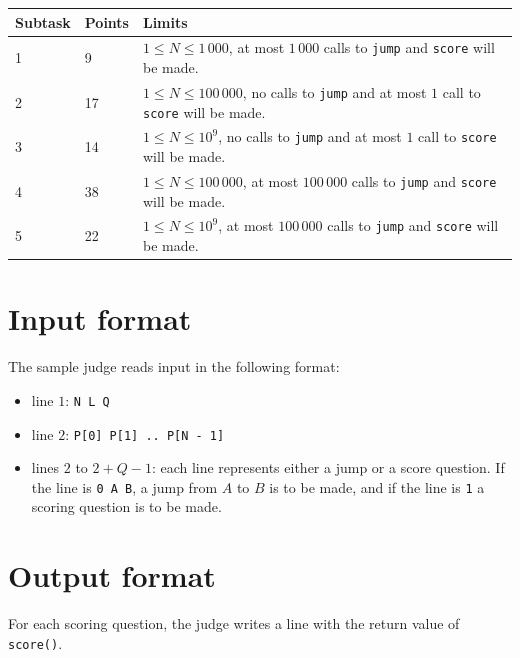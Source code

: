 \begin{tabular}{|l|l|l|}
  \hline
  \textbf{Subtask} & \textbf{Points} & \textbf{Limits} \\ \hline
  1 & 9 & $1 \le N \le 1\,000$, at most $1\,000$ calls to \texttt{jump} and \texttt{score} will be made. \\ \hline
  2 & 17 & $1 \le N \le 100\,000$, no calls to \texttt{jump} and at most $1$ call to \texttt{score} will be made. \\ \hline
  3 & 14 & $1 \le N \le 10^9$, no calls to \texttt{jump} and at most $1$ call to \texttt{score} will be made. \\ \hline
  4 & 38 & $1 \le N \le 100\,000$, at most $100\,000$ calls to \texttt{jump} and \texttt{score} will be made. \\ \hline
  5 & 22 & $1 \le N \le 10^9$, at most $100\,000$ calls to \texttt{jump} and \texttt{score} will be made. \\ \hline
\end{tabular}

\section*{Input format}
The sample judge reads input in the following format:

\begin{itemize}
  \item line $1$: \texttt{N L Q}
  \item line $2$: \texttt{P[0] P[1] .. P[N - 1]}
  \item lines $2$ to $2 + Q - 1$: each line represents either a jump or a score question.
    If the line is \texttt{0 A B}, a jump from $A$ to $B$ is to be made, and if the line is \texttt{1} a scoring question is to be made.
\end{itemize}

\section*{Output format}
For each scoring question, the judge writes a line with the return value of \texttt{score()}.
